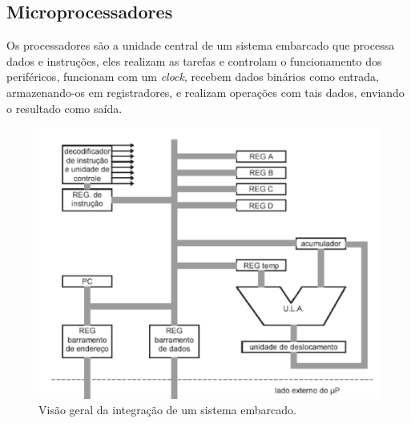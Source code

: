 \subsection{Microprocessadores}

Os processadores são a unidade central de um sistema embarcado que processa dados e instruções, eles realizam as tarefas e controlam o funcionamento dos periféricos, funcionam com um \textit{clock}, recebem dados binários como entrada, armazenando-os em registradores, e realizam operações com tais dados, enviando o resultado como saída. 


\begin{figure}[ht]
    \begin{center}
    \includegraphics{figuras/processor.PNG}
    \end{center}
    \caption[Sistema embarcado]{Visão geral da integração de um sistema embarcado.}
    \label{processor}
\end{figure}

